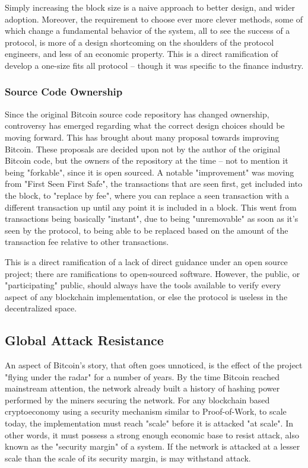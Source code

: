 \documentclass[12pt, titlepage, twocolumn]{report}
\begin{document}
Simply increasing the block size is a naive approach to better design, and wider adoption. Moreover, the requirement to choose ever more clever methods, some of which change a fundamental behavior of the system, all to see the success of a protocol, is more of a design shortcoming on the shoulders of the protocol engineers, and less of an economic property. This is a direct ramification of develop a one-size fits all protocol -- though it was specific to the finance industry. 

\subsubsection{Source Code Ownership}
Since the original Bitcoin source code repository has changed ownership, controversy has emerged regarding what the correct design choices should be moving forward. This has brought about many proposal towards improving Bitcoin. These proposals are decided upon not by the author of the original Bitcoin code, but the owners of the repository at the time -- not to mention it being "forkable", since it is open sourced. A notable "improvement" was moving from "First Seen First Safe", the transactions that are seen first, get included into the block, to "replace by fee", where you can replace a seen transaction with a different transaction up until any point it is included in a block. This went from transactions being basically "instant", due to being "unremovable" as soon as it's seen by the protocol, to being able to be replaced based on the amount of the transaction fee relative to other transactions.

This is a direct ramification of a lack of direct guidance under an open source project; there are ramifications to open-sourced software. However, the public, or "participating" public, should always have the tools available to verify every aspect of any blockchain implementation, or else the protocol is useless in the decentralized space.


\subsection{Global Attack Resistance}
An aspect of Bitcoin's story, that often goes unnoticed, is the effect of the project "flying under the radar" for a number of years. By the time Bitcoin reached mainstream attention, the network already built a history of hashing power performed by the miners securing the network. For any blockchain based cryptoeconomy using a security mechanism similar to Proof-of-Work, to scale today, the implementation must reach "scale" before it is attacked "at scale". In other words, it must possess a strong enough economic base to resist attack, also known as the "security margin" of a system. If the network is attacked at a lesser scale than the scale of its security margin, is may withstand attack.
\end{document}
